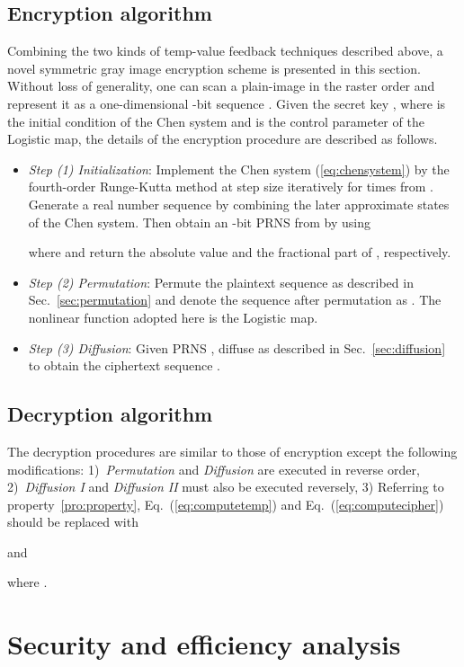\documentclass[3p,preprint,11pt]{elsarticle}
\begin{document}
\subsection{Encryption algorithm}
\label{sec:encryption}
Combining the two kinds of temp-value feedback techniques described above, a novel symmetric
gray image encryption scheme is presented in this section. Without loss of generality, one can
scan a plain-image in the raster order and represent it as a one-dimensional -bit sequence
. Given the secret key , where  is the initial
condition of the Chen system and  is the control parameter of the Logistic map, the details of the encryption procedure are described as follows.
\begin{itemize}
\item \textit{Step (1) Initialization}: Implement the Chen system (\ref{eq:chensystem})
by the fourth-order Runge-Kutta method at step size  iteratively for
 times from . Generate a real number sequence  by
combining the later  approximate states of the Chen system. Then obtain
an -bit PRNS  from  by using

where  and   return the absolute value and the fractional part
of , respectively.

\item \textit{Step (2) Permutation}: Permute the plaintext sequence  as described in Sec.~\ref{sec:permutation} and denote the sequence after permutation as . The nonlinear
    function adopted here is the Logistic map.

\item \textit{Step (3) Diffusion}: Given PRNS , diffuse 
    as described in Sec.~\ref{sec:diffusion} to obtain the ciphertext sequence .
\end{itemize}

\subsection{Decryption algorithm}
The decryption procedures are similar to those of encryption except the following modifications:
1)~\textit{Permutation} and \textit{Diffusion} are executed in reverse order,
2)~\textit{Diffusion I} and \textit{Diffusion II} must also be
executed reversely, 3) Referring to property~\ref{pro:property}, Eq.~(\ref{eq:computetemp}) and Eq.~(\ref{eq:computecipher}) should be replaced with

and

where .


\section{Security and efficiency analysis}
\label{sec:securityanalysis}
\end{document}
